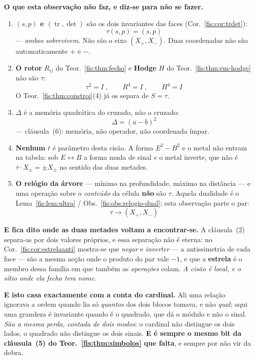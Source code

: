 \documentclass[livro.tex]{subfiles}
\begin{document}
\begin{observacao}
\medskip\noindent\textbf{O que esta observação não faz, e diz-se para não se
fazer.}
\begin{enumerate}\itemsep2pt
\item[$\bullet$] \textbf{$(s,p)$ e $(\operatorname{tr},\det)$} são os dois
invariantes das faces (Cor.~\ref{fis:cor:trdet}):
\[
\boxed{\;\tau(s,p)=(s,p)\;}
\]
--- \emph{ambos sobrevivem}. Não são o eixo $(X_{+},X_{-})$. Duas coordenadas
não são automaticamente $+$ e $-$.
\item[$\bullet$] \textbf{O rotor} $R_{ij}$ do Teor.~\ref{fis:thm:fecho} e
\textbf{Hodge} $H$ do Teor.~\ref{fis:thm:em-hodge} não são $\tau$:
\[
\boxed{\;\tau^{2}=I\;,\qquad R^{4}=I\;,\qquad H^{4}=I\;}
\]
O Teor.~\ref{fis:thm:constroi}(4) já os separa de $S=\tau$.
\item[$\bullet$] \textbf{$\Delta$} é a memória quadrática do cruzado, não o
cruzado:
\[
\boxed{\;\Delta=(a-b)^{2}\;}
\]
--- cláusula~(6): memória, não operador, não coordenada ímpar.
\item[$\bullet$] \textbf{Nenhum $t$} é parâmetro desta cisão. A forma
$E^{2}-B^{2}$ e o metal não entram na tabela: sob $E\leftrightarrow B$ a forma
muda de sinal \emph{e} o metal inverte, que não é $\tau\cdot X_{\pm}=\pm X_{\pm}$
no sentido das duas metades.
\item[$\bullet$] \textbf{O relógio da árvore} --- mínimo na profundidade, máximo
na distância --- e uma operação sobre o \emph{conteúdo} da célula \textbf{não}
são $\tau$. Aquela dualidade é o Lema~\ref{fis:lem:ultra} /
Obs.~\ref{fis:obs:relogio-dual}; esta observação parte o par:
\[
\boxed{\;\tau\longrightarrow(X_{+},X_{-})\;}
\]
\end{enumerate}
\end{observacao}

\medskip\noindent\textbf{E fica dito onde as duas metades voltam a encontrar-se.}
A cláusula~(2) separa-as por dois valores próprios, e essa separação não é
eterna: no Cor.~\ref{fis:cor:estrelaanti} mostra-se que \emph{negar} e
\emph{inverter} --- a antissimetria de cada face --- são a mesma acção onde o
produto do par vale $-1$, e que a \textbf{estrela} é o membro dessa família em
que também as \emph{operações} colam. \emph{A cisão é local, e o sítio onde ela
fecha tem nome.}

\medskip\noindent\textbf{E isto casa exactamente com a conta do cardinal.} Ali
uma relação ignorava a ordem quando lia só \emph{quantos} dos dois blocos tomava,
e não \emph{qual}; aqui uma grandeza é invariante quando é o quadrado, que dá o
módulo e não o sinal. \emph{São a mesma perda, contada de dois modos}: o cardinal
não distingue os dois lados, o quadrado não distingue os dois sinais. \textbf{E é
sempre o mesmo bit da cláusula~(5) do Teor.~\ref{fis:thm:simbolos} que falta}, e
sempre por não vir da dobra.
\end{document}
